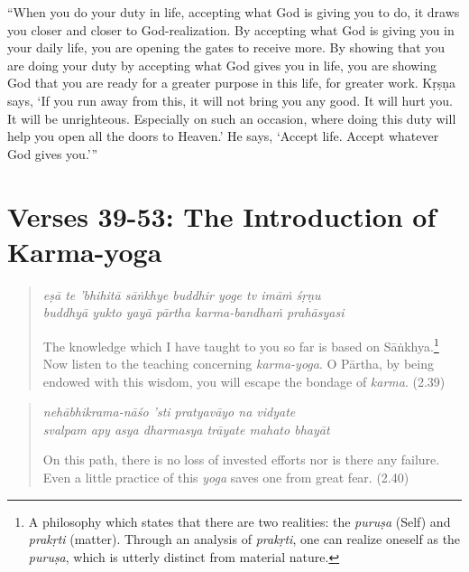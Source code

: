 \documentclass[12pt, twoside, openright]{memoir}
\begin{document}
\enquote{When you do your duty in life, accepting what God is giving you to do, it draws you closer and closer to God-realization. By accepting what God is giving you in your daily life, you are opening the gates to receive more. By showing that you are doing your duty by accepting what God gives you in life, you are showing God that you are ready for a greater purpose in this life, for greater work. Kṛṣṇa says, \enquote{If you run away from this, it will not bring you any good. It will hurt you. It will be unrighteous. Especially on such an occasion, where doing this duty will help you open all the doors to Heaven.} He says, \enquote{Accept life. Accept whatever God gives you.}}

\section{Verses 39-53: The Introduction of Karma-yoga}\label{sec-verses-39-53-the-introduction-of-karma-yoga}


\par
\begin{verse}
\textit{eṣā te ’bhihitā sāṅkhye buddhir yoge tv imāṁ śṛṇu} \\
\textit{buddhyā yukto yayā pārtha karma-bandhaṁ prahāsyasi}

\noindent The knowledge which I have taught to you so far is based on Sāṅkhya.\footnote{A philosophy which states that there are two realities: the \textit{puruṣa} (Self) and \textit{prakṛti} (matter). Through an analysis of \textit{prakṛti}, one can realize oneself as the \textit{puruṣa}, which is utterly distinct from material nature.} Now listen to the teaching concerning \textit{karma-yoga}. O Pārtha, by being endowed with this wisdom, you will escape the bondage of \textit{karma}. (2.39)
\end{verse}
\par



\par
\begin{verse}
\textit{nehābhikrama-nāśo ’sti pratyavāyo na vidyate} \\
\textit{svalpam apy asya dharmasya trāyate mahato bhayāt}

\noindent On this path, there is no loss of invested efforts nor is there any failure. Even a little practice of this \textit{yoga} saves one from great fear. (2.40)
\end{verse}
\par
\end{document}
